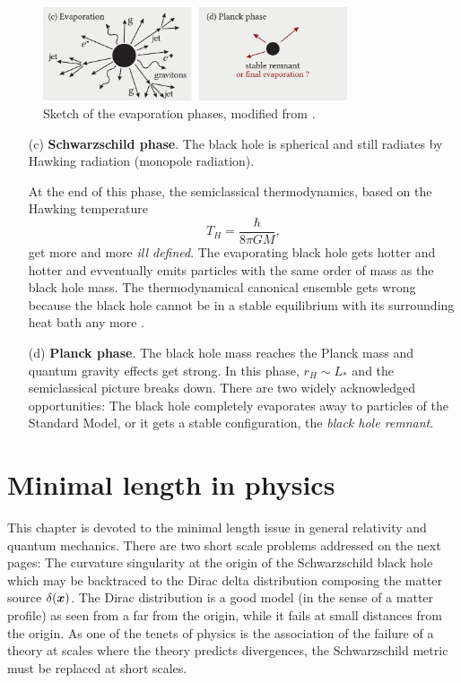 \documentclass[12pt,a4paper]{report}
\numberwithin{equation}{chapter}
\begin{document}
\begin{figure}[h!]
\includegraphics[width=0.8\textwidth]{figures/bhphase-cd.pdf}
\caption[Illustration about the evaporation phases, taken and modified from \cite{Hossenfelder2004}]{Sketch of the evaporation phases, modified from \cite{Hossenfelder2004}.}\label{fig:evaphases2}
\end{figure}

\begin{enumerate}
\item[(c)] {\bf Schwarzschild phase}. The black hole is spherical and still radiates by Hawking radiation (monopole radiation).

At the end of this phase, the semiclassical thermodynamics, based on the Hawking temperature
\begin{equation}
T_H = \frac{\hbar}{8\pi GM},
\end{equation}
get more and more \emph{ill defined}. The evaporating black hole gets hotter and hotter and evventually emits particles with the same order of mass as the black hole mass. The thermodynamical canonical ensemble gets wrong because the black hole cannot be in a stable equilibrium with its surrounding heat bath any more \cite{frolov}.

\item[(d)] {\bf Planck phase}. The black hole mass reaches the Planck mass and quantum gravity effects get strong. In this phase, $r_H \sim L_*$ and the semiclassical picture breaks down. There are two widely acknowledged opportunities: The black hole completely evaporates away to particles of the Standard Model, or it gets a stable configuration, the \emph{black hole remnant}.
\end{enumerate}



\chapter{Minimal length in physics}\label{sec:minial-length}
This chapter is devoted to the minimal length issue in general relativity and quantum mechanics. There are two short scale problems addressed on the next pages: The curvature singularity at the origin of the Schwarzschild black hole which may be backtraced to the Dirac delta distribution composing the matter source $\delta(\boldsymbol{ x })$. The Dirac distribution is a good model (in the sense of a matter profile) as seen from a far from the origin, while it fails at small distances from the origin. As one of the tenets of physics is the association of the failure of a theory at scales where the theory predicts divergences, the Schwarzschild metric must be replaced at short scales.
\end{document}
